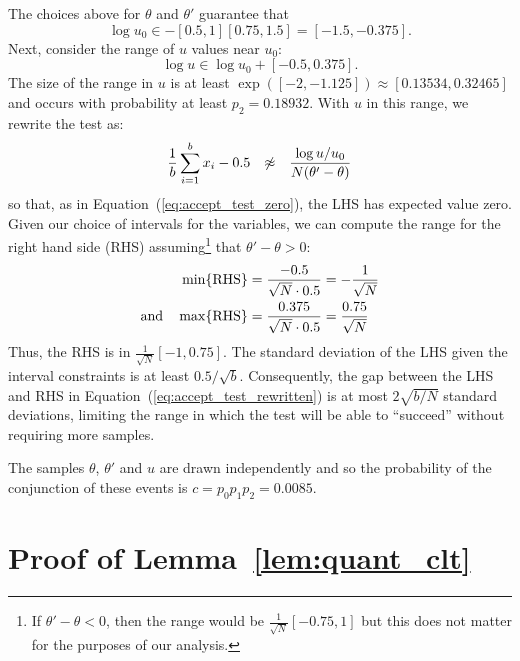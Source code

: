 \documentclass[twoside]{article} \usepackage{aistats2017}
\begin{document}
The choices above for $\theta$ and $\theta'$ guarantee that
\begin{equation}\label{eq:log_uo_range}
    \log u_0 \in -[0.5,1][0.75,1.5] = [-1.5, -0.375].
\end{equation}
Next, consider the range of $u$ values near $u_0$:
\begin{equation}\label{eq:log_u_range}
    \log u \in \log u_0 + [-0.5,0.375].
\end{equation}
The size of the range in $u$ is at least $\exp([-2,-1.125]) \approx
[0.13534,0.32465]$ and occurs with probability at least $p_2=0.18932$. With $u$
in this range, we rewrite the test as:
\begin{equation}\label{eq:accept_test_rewritten}
    \frac{1}{b}\sum_{i=1}^b x_i-0.5 \hspace{0.1in} \not\approx \hspace{0.1in} \frac{\log u/u_0}{N(\theta'-\theta)}
\end{equation}
so that, as in Equation~(\ref{eq:accept_test_zero}), the LHS has expected value
zero.  Given our choice of intervals for the variables, we can compute the range
for the right hand side (RHS) assuming\footnote{If $\theta'-\theta<0$, then the
range would be $\frac{1}{\sqrt{N}}[-0.75,1]$ but this does not matter for
the purposes of our analysis.} that $\theta'-\theta > 0$:
\begin{equation}\label{eq:rhs_range}
\begin{split}
    \min\{{\rm RHS}\} & = \frac{-0.5}{\sqrt{N} \cdot 0.5} = -\frac{1}{\sqrt{N}} \\
    {\rm and} \quad \max\{{\rm RHS}\} & = \frac{0.375}{\sqrt{N} \cdot 0.5} = \frac{0.75}{\sqrt{N}}
\end{split}
\end{equation}
Thus, the RHS is in $\frac{1}{\sqrt{N}}[-1,0.75]$.  The standard deviation of
the LHS given the interval constraints is at least $0.5/\sqrt{b}$.
Consequently, the gap between the LHS and RHS in
Equation~(\ref{eq:accept_test_rewritten}) is at most $2\sqrt{b/N}$ standard
deviations, limiting the range in which the test will be able to ``succeed''
without requiring more samples.

The samples $\theta$, $\theta'$ and $u$ are drawn independently and so the
probability of the conjunction of these events is $c = p_0 p_1 p_2 = 0.0085$.




\section{Proof of Lemma~\ref{lem:quant_clt}}\label{app:quant_clt}
\end{document}
